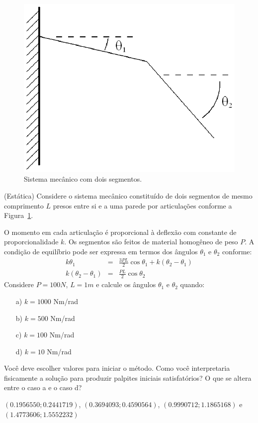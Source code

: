 \begin{figure}
        \centering
	    \includegraphics[width=.5\textwidth]{cap_nlinsis/pics/dois_segmentos}
		\caption{Sistema mecânico com dois segmentos.}
		\label{pic:dois_segmentos}
	\end{figure}

\begin{exer}{(Estática)}\label{prob:dois_segmentos} Considere o sistema mecânico constituído de dois segmentos de mesmo comprimento $L$ presos entre si e a uma parede por articulações conforme a Figura~\ref{pic:dois_segmentos}.

O momento em cada articulação é proporcional à deflexão com constante de proporcionalidade $k$. Os segmentos são feitos de material homogêneo de peso $P$. A condição de equilíbrio pode ser expressa em termos dos ângulos $\theta_1$ e $\theta_2$ conforme:
\begin{eqnarray*}
k\theta_1&=& \frac{3PL}{2}\cos\theta_1 + k\left(\theta_2-\theta_1\right)\\
k\left(\theta_2-\theta_1\right)&=& \frac{PL}{2}\cos\theta_2
\end{eqnarray*}
Considere $P=100N$, $L=1m$ e calcule os ângulos $\theta_1$ e $\theta_2$ quando:
\begin{itemize}
\item[a)] $k=1000$ Nm/rad
\item[b)] $k=500$ Nm/rad
\item[c)] $k=100$ Nm/rad
\item[d)] $k=10$ Nm/rad
\end{itemize}
Você deve escolher valores para iniciar o método. Como você interpretaria fisicamente a solução para produzir palpites iniciais satisfatórios? O que se altera entre o caso a e o caso d?
\end{exer}
\begin{resp}
$\left(0.1956550;0.2441719 \right)$, $\left(0.3694093;0.4590564\right) $, $\left( 0.9990712;1.1865168  \right)$ e $\left(1.4773606;1.5552232 \right)$
\end{resp}


